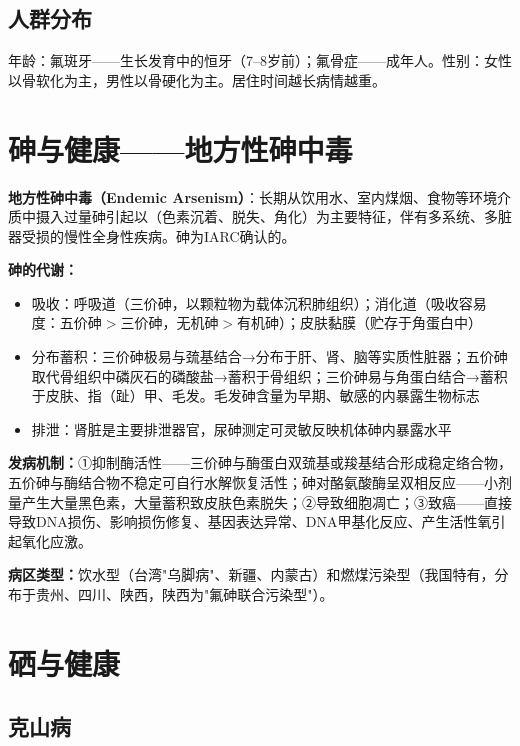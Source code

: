 \subsection{人群分布}

年龄：氟斑牙——生长发育中的恒牙（7--8岁前）；氟骨症——成年人。性别：女性以骨软化为主，男性以骨硬化为主。居住时间越长病情越重。

\section{砷与健康——地方性砷中毒}

\begin{defbox}
\textbf{地方性砷中毒（Endemic Arsenism）}：长期从饮用水、室内煤烟、食物等环境介质中摄入过量砷引起以（色素沉着、脱失、角化）为主要特征，伴有多系统、多脏器受损的慢性全身性疾病。砷为IARC确认的。

\textbf{砷的代谢：}
\begin{itemize}[leftmargin=*]
    \item 吸收：呼吸道（三价砷，以颗粒物为载体沉积肺组织）；消化道（吸收容易度：五价砷$>$三价砷，无机砷$>$有机砷）；皮肤黏膜（贮存于角蛋白中）
    \item 分布蓄积：三价砷极易与巯基结合→分布于肝、肾、脑等实质性脏器；五价砷取代骨组织中磷灰石的磷酸盐→蓄积于骨组织；三价砷易与角蛋白结合→蓄积于皮肤、指（趾）甲、毛发。毛发砷含量为早期、敏感的内暴露生物标志
    \item 排泄：肾脏是主要排泄器官，尿砷测定可灵敏反映机体砷内暴露水平
\end{itemize}

\textbf{发病机制：}①抑制酶活性——三价砷与酶蛋白双巯基或羧基结合形成稳定络合物，五价砷与酶结合物不稳定可自行水解恢复活性；砷对酪氨酸酶呈双相反应——小剂量产生大量黑色素，大量蓄积致皮肤色素脱失；②导致细胞凋亡；③致癌——直接导致DNA损伤、影响损伤修复、基因表达异常、DNA甲基化反应、产生活性氧引起氧化应激。

\textbf{病区类型：}饮水型（台湾"乌脚病"、新疆、内蒙古）和燃煤污染型（我国特有，分布于贵州、四川、陕西，陕西为"氟砷联合污染型"）。
\end{defbox}

\section{硒与健康}

\subsection{克山病}


